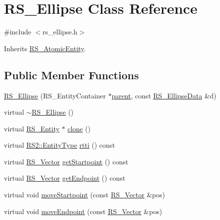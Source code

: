 \hypertarget{class_r_s___ellipse}{\section{R\-S\-\_\-\-Ellipse Class Reference}
\label{class_r_s___ellipse}
}


{\ttfamily \#include $<$rs\-\_\-ellipse.\-h$>$}



Inherits \hyperlink{class_r_s___atomic_entity}{R\-S\-\_\-\-Atomic\-Entity}.

\subsection*{Public Member Functions}
\begin{DoxyCompactItemize}
\item 
\hyperlink{class_r_s___ellipse_a3e74f3a304ab2960fcf71f1698cf39ff}{R\-S\-\_\-\-Ellipse} (R\-S\-\_\-\-Entity\-Container $\ast$\hyperlink{class_r_s___entity_a80358a8d2fc6739a516a278dc500b49f}{parent}, const \hyperlink{class_r_s___ellipse_data}{R\-S\-\_\-\-Ellipse\-Data} \&d)
\item 
virtual \hyperlink{class_r_s___ellipse_a711e793e74ccb9590e3fe86b53a570c8}{$\sim$\-R\-S\-\_\-\-Ellipse} ()
\item 
virtual \hyperlink{class_r_s___entity}{R\-S\-\_\-\-Entity} $\ast$ \hyperlink{class_r_s___ellipse_ad690a645f653b3ee711c06634cbc40e1}{clone} ()
\item 
virtual \hyperlink{class_r_s2_a8f26d1b981e1e85cff16738b43337e6a}{R\-S2\-::\-Entity\-Type} \hyperlink{class_r_s___ellipse_acffbf75de7227ff1336bad7b48c329b2}{rtti} () const 
\item 
virtual \hyperlink{class_r_s___vector}{R\-S\-\_\-\-Vector} \hyperlink{class_r_s___ellipse_a69a4fb89ad07c48686c0ce0bf8140291}{get\-Startpoint} () const 
\item 
virtual \hyperlink{class_r_s___vector}{R\-S\-\_\-\-Vector} \hyperlink{class_r_s___ellipse_a03c227db29f9715609b563952f8433bd}{get\-Endpoint} () const 
\item 
virtual void \hyperlink{class_r_s___ellipse_aba3d848fb8fe062b511eef9391e66806}{move\-Startpoint} (const \hyperlink{class_r_s___vector}{R\-S\-\_\-\-Vector} \&pos)
\item 
virtual void \hyperlink{class_r_s___ellipse_a86c58e1c1ccb5b0e8d15322fb811ceb1}{move\-Endpoint} (const \hyperlink{class_r_s___vector}{R\-S\-\_\-\-Vector} \&pos)
\item 

\end{DoxyCompactItemize}
